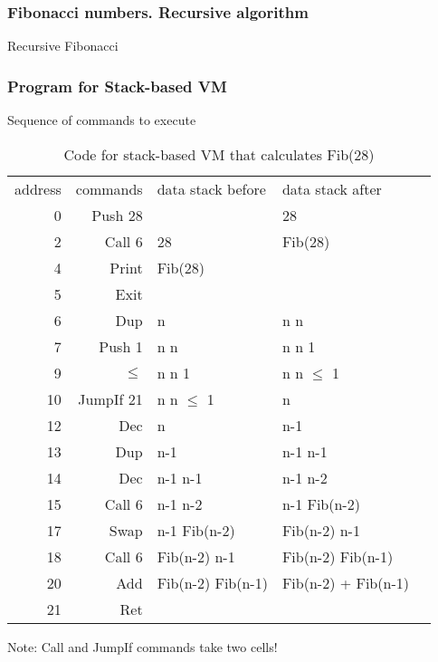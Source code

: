 \documentclass[hyperref={colorlinks=true},xcolor=table]{beamer}
\begin{document}
\begin{frame}
  \frametitle{Fibonacci numbers. Recursive algorithm}
  \begin{algorithm}[H]
    \caption{Recursive Fibonacci}
  \end{algorithm}
\end{frame}

\begin{frame}
  \frametitle{Program for Stack-based VM}
  Sequence of commands to execute
  \begin{table}
    \scriptsize
    \begin{tabular}{ r | r | l | l | l }
      \rowcolor{lightgray} address & commands & data stack before & data stack after \\
      0 & Push 28 & & 28 \\
      2 & Call 6 & 28 & Fib(28) \\
      4 & Print & Fib(28) & \\
      5 & Exit & \\

      \hline

      6 & Dup & n & n n \\
      7 & Push 1 & n n & n n 1 \\
      9 & $\le$ & n n 1 & n n $\le$ 1 \\
      10 & JumpIf 21 & n n $\le$ 1 & n \\
      12 & Dec & n & n-1 \\
      13 & Dup & n-1 & n-1 n-1 \\
      14 & Dec & n-1 n-1 & n-1 n-2 \\
      15 & Call 6 & n-1 n-2 & n-1 Fib(n-2) \\
      17 & Swap & n-1 Fib(n-2) & Fib(n-2) n-1 \\
      18 & Call 6 & Fib(n-2) n-1 & Fib(n-2) Fib(n-1) \\
      20 & Add & Fib(n-2) Fib(n-1) & Fib(n-2) + Fib(n-1) \\
      21 & Ret & \\
    \end{tabular}
    \normalsize
    \caption{Code for stack-based VM that calculates Fib(28)}
  \end{table}
  Note: Call and JumpIf commands take two cells!
\end{frame}
\end{document}
